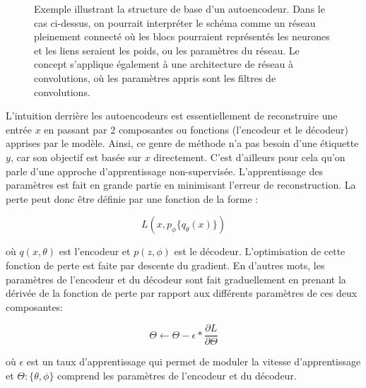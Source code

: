 \begin{figure}[h]
	\caption{Exemple illustrant la structure de base d'un autoencodeur. Dans le cas ci-dessus, on pourrait interpréter le schéma comme un réseau pleinement connecté où les blocs pourraient représentés les neurones et les liens seraient les poids, ou les paramètres du réseau. Le concept s'applique également à une architecture de réseau à convolutions, où les paramètres appris sont les filtres de convolutions.}
	\label{fig:basicAE}
\end{figure}

L'intuition derrière les autoencodeurs est essentiellement de reconstruire une entrée $x$ en passant par 2 composantes ou fonctions (l'encodeur et le décodeur) apprises par le modèle. Ainsi, ce genre de méthode n'a pas besoin d'une étiquette $y$, car son objectif est basée sur $x$ directement. C'est d'ailleurs pour cela qu'on parle d'une approche d'apprentissage non-supervisée. L'apprentissage des paramètres est fait en grande partie en minimisant l'erreur de reconstruction. La perte peut donc être définie par une fonction de la forme :

$$
L(x, p_\phi{\{q_\theta(x)\}})
$$

\noindent où $q(x, \theta)$ est l'encodeur et $p(z,\phi)$ est le décodeur. L'optimisation de cette fonction de perte est faite par descente du gradient. En d'autres mots, les paramètres de l'encodeur et du décodeur sont fait graduellement en prenant la dérivée de la fonction de perte par rapport aux différents paramètres de ces deux composantes:


\begin{equation} \label{optim}
\Theta \leftarrow \Theta-\epsilon*\frac{\partial L}{\partial\Theta}
\end{equation}

\noindent où $\epsilon$ est un taux d'apprentissage qui permet de moduler la vitesse d'apprentissage et $\Theta : \{\theta, \phi\}$ comprend les paramètres de l'encodeur et du décodeur.

